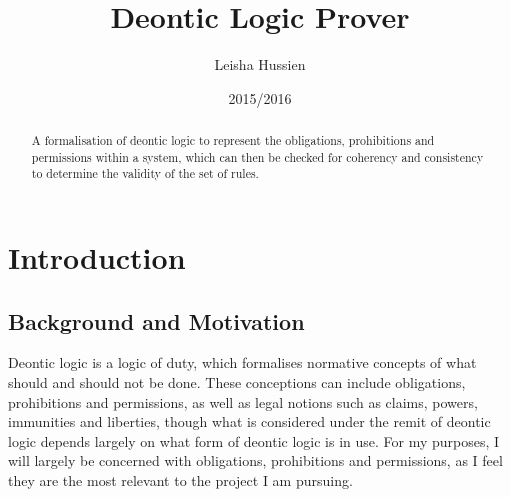 \documentclass{l4proj}
\begin{document}
\title{Deontic Logic Prover}
\author{Leisha Hussien}
\date{2015/2016}
\maketitle

\begin{abstract}
A formalisation of deontic logic to represent the obligations, prohibitions and permissions within a system, which can then be checked for coherency and consistency to determine the validity of the set of rules.
\end{abstract}

\educationalconsent

\tableofcontents













\chapter{Introduction}

\section{Background and Motivation}%
Deontic logic is a logic of duty, which formalises normative concepts of what should and should not be done. These conceptions can include obligations, prohibitions and permissions, as well as legal notions such as claims, powers, immunities and liberties, though what is considered under the remit of deontic logic depends largely on what form of deontic logic is in use. For my purposes, I will largely be concerned with obligations, prohibitions and permissions, as I feel they are the most relevant to the project I am pursuing.
\end{document}
